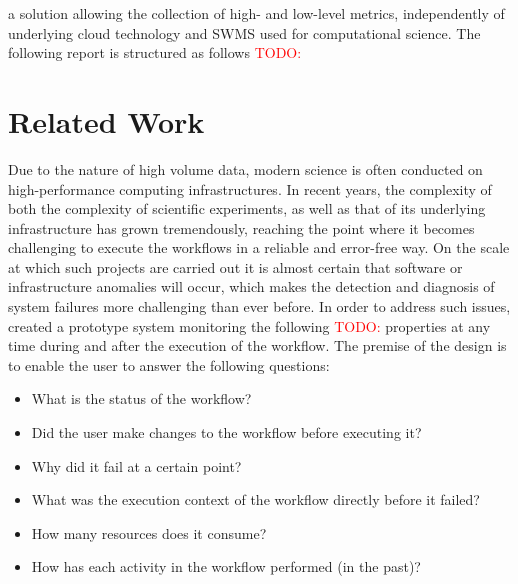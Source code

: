 \documentclass[lettersize,journal]{IEEEtran}
\newcommand{\todo}[1]{\textcolor{red}{TODO: #1}\PackageWarning{TODO:}{#1!}}
\begin{document}
a solution allowing the collection of high- and low-level metrics, independently of underlying cloud technology and SWMS used for computational science. The following report is structured as follows \todo{}
	
	
	\section{Related Work}
	Due to the nature of high volume data, modern science is often conducted on high-performance computing infrastructures. In recent years, the complexity of both the complexity of scientific experiments, as well as that of its underlying infrastructure has grown tremendously, reaching the point where it becomes challenging to execute the workflows in a reliable and error-free way. On the scale at which such projects are carried out it is almost certain that software or infrastructure anomalies will occur, which makes the detection and diagnosis of system failures more challenging than ever before. In order to address such issues, \citeauthor{valerio2008capturingworkflowevent} created a prototype system monitoring the following \todo{} properties at any time during and after the execution of the workflow. The premise of the design is to enable the user to answer the following questions:
	
	\begin{itemize}
		\item What is the status of the workflow?
		\item Did the user make changes to the workflow before executing it?
		\item Why did it fail at a certain point?
		\item What was the execution context of the workflow directly before it failed?
		\item How many resources does it consume?
		\item How has each activity in the workflow performed (in the past)?
	\end{itemize}
	
\end{document}
